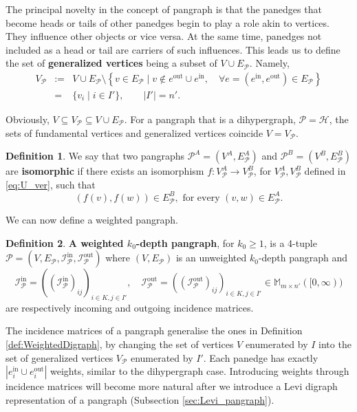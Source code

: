 \documentclass[a4paper,12pt]{article}
\theoremstyle{definition}
\newtheorem{definition}{Definition}
\theoremstyle{remark}
\newcommand{\mH}{\mathcal{H}}
\newcommand{\mP}{\mathcal{P}}
\newcommand{\EP}{E_{\mathcal{P}}}
\newcommand{\tin}{\mathrm{in}}
\newcommand{\out}{\mathrm{out}}
\newcommand{\incip}{\mathcal{I}^{\tin}_{\mP}}
\newcommand{\incop}{\mathcal{I}^{\out}_{\mP}}
\begin{document}
The principal novelty in the concept of pangraph is that the panedges that become heads
or tails of other panedges begin to play a role akin to vertices. They influence other objects
or vice versa. At the same time, panedges not included as a head
or tail are carriers of such influences.  This leads us to define the set of \textbf{generalized vertices} being a subset of $V\cup E_{\mP}$. Namely,
\begin{eqnarray}\label{eq:U_ver}
V_{\mP}&:=&V\cup E_{\mP}\setminus \left\{v\in E_{\mP}\;|\; v\notin e^{\mathrm{out}}\cup e^{\mathrm{in}}, \quad \forall e=(e^{\tin},e^{\out})\in E_{\mP} \right\}\\ \nonumber
&=&\{v_i\;|\; i\in I'\},\qquad |I'|=n'.
\end{eqnarray}

Obviously, $V\subseteq V_{\mP}\subseteq V\cup E_{\mathcal{P}}$. For a pangraph that is a dihypergraph, $\mP=\mH$, the sets of fundamental vertices and generalized vertices coincide $V=V_{\mP}$. 

\begin{definition}\label{df:pan_izo} We say that two pangraphs $\mP^A=(V^A,\EP^A)$ and $\mP^B=(V^B,\EP^B)$ are \textbf{isomorphic} if there exists an isomorphism $f:V_{\mP}^{A} \to V_{\mP}^{B}$, for $V_{\mP}^{A}, V_{\mP}^{B}$ defined in \eqref{eq:U_ver}, such that 
\begin{equation*}
(f(v),f(w))\in \EP^B,\,\, \text{for every }(v,w)\in \EP^A.
\end{equation*}
\end{definition}

We can now define a weighted pangraph.

\begin{definition}
\textbf{A weighted $k_0$-depth pangraph}, for $k_0\geq 1$, is a 4-tuple $\mP= (V,\EP, \incip,\incop)$ where $ (V,\EP)$ is an unweighted $k_0$-depth pangraph and 
\begin{equation}
\incip=(({\incip})_{ij})_{i\in K,j\in I'},\quad \incop=(({\incop})_{ij})_{i\in K,j\in I'}\in \mathbb{M}_{m\times n'}([0,\infty))
\end{equation}
are respectively incoming and outgoing incidence matrices. 
\end{definition}
The incidence matrices of a pangraph generalise the ones in Definition \ref{def:WeightedDigraph}, by changing the set of vertices $V$ enumerated by $I$ into the set of generalized vertices $V_{\mP}$ enumerated by $I'$. Each panedge has exactly $|e_i^{\tin}\cup e_i^{\out}|$ weights, similar to the dihypergraph case. Introducing weights through incidence matrices will become more natural after we introduce a Levi digraph representation of a pangraph (Subsection \ref{sec:Levi_pangraph}).
\end{document}
